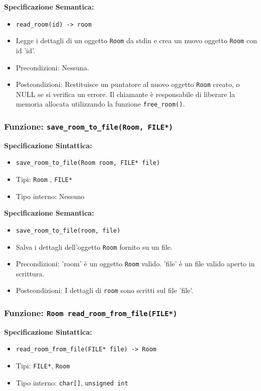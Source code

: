 \documentclass[11pt]{scrartcl} %
\begin{document}
\textbf{Specificazione Semantica:}
\begin{itemize}
	\item \texttt{read\_room(id) -> room}
	\item Legge i dettagli di un oggetto \texttt{Room} da stdin e crea un nuovo oggetto \texttt{Room} con id 'id'.
	\item Precondizioni: Nessuna.
	\item Postcondizioni: Restituisce un puntatore al nuovo oggetto \texttt{Room} creato, o NULL se si verifica un errore. Il chiamante è responsabile di liberare la memoria allocata utilizzando la funzione \texttt{free\_room()}.
\end{itemize}

\subsubsection{Funzione: \texttt{save\_room\_to\_file(Room, FILE*)}}

\textbf{Specificazione Sintattica:}
\begin{itemize}
	\item \texttt{save\_room\_to\_file(Room room, FILE* file)}
	\item Tipi: \texttt{Room} , \texttt{FILE*}
	\item Tipo interno: Nessuno
\end{itemize}

\textbf{Specificazione Semantica:}
\begin{itemize}
	\item \texttt{save\_room\_to\_file(room, file)}
	\item Salva i dettagli dell'oggetto \texttt{Room} fornito su un file.
	\item Precondizioni: 'room' è un oggetto \texttt{Room} valido. 'file' è un file valido aperto in scrittura.
	\item Postcondizioni: I dettagli di \texttt{room} sono scritti sul file 'file'.
\end{itemize}

\subsubsection{Funzione: \texttt{Room read\_room\_from\_file(FILE*)}}

\textbf{Specificazione Sintattica:}
\begin{itemize}
	\item \texttt{read\_room\_from\_file(FILE* file) -> Room}
	\item Tipi: \texttt{FILE*}, \texttt{Room}
	\item Tipo interno: \texttt{char[]}, \texttt{unsigned int}
\end{itemize}
\end{document}
